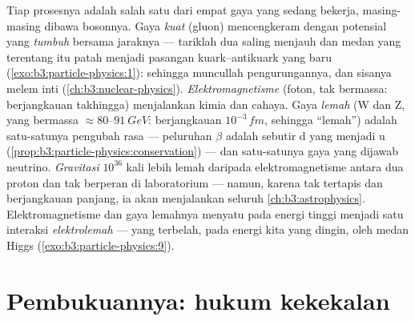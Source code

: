 \begin{remark}\label{rem:b3:particle-physics:forces}
Tiap prosesnya adalah salah satu dari empat gaya yang sedang bekerja,
masing-masing dibawa bosonnya. Gaya \emph{kuat} (gluon) mencengkeram  dengan
potensial yang \emph{tumbuh} bersama jaraknya --- tariklah dua 
saling menjauh dan medan yang terentang itu patah menjadi pasangan
kuark--antikuark yang baru (\cref{exo:b3:particle-physics:1}): sehingga muncullah
pengurungannya, dan sisanya melem inti
(\cref{ch:b3:nuclear-physics}). \emph{Elektromagnetisme} (foton,
tak bermassa: berjangkauan takhingga) menjalankan kimia dan cahaya. Gaya
\emph{lemah} (W dan Z, yang bermassa
$\approx80$--$\qty{91}{GeV}$: berjangkauan $10^{-3}\,\unit{fm}$,
sehingga ``lemah'') adalah satu-satunya pengubah rasa --- peluruhan $\beta$ adalah
sebutir  d yang menjadi u
(\cref{prop:b3:particle-physics:conservation}) --- dan satu-satunya
gaya yang dijawab neutrino. \emph{Gravitasi} $10^{36}$ kali
lebih lemah daripada elektromagnetisme antara dua proton dan tak berperan
di laboratorium --- namun, karena tak tertapis dan berjangkauan panjang, ia akan menjalankan
seluruh \cref{ch:b3:astrophysics}. Elektromagnetisme dan gaya
lemahnya menyatu pada energi tinggi menjadi satu interaksi
\emph{elektrolemah} --- yang terbelah, pada energi kita yang dingin, oleh
 medan Higgs (\cref{exo:b3:particle-physics:9}).
\end{remark}

\section{Pembukuannya: hukum kekekalan}


